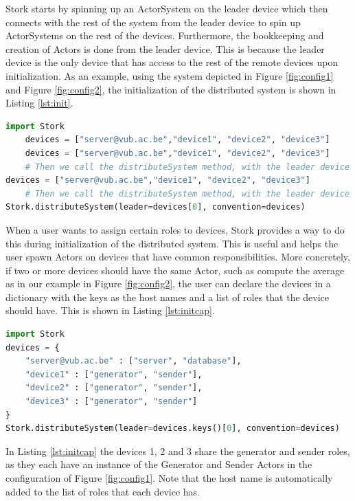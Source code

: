 \documentclass[a4paper]{article}
\begin{document}
Stork starts by spinning up an ActorSystem on the leader device which then connects with the rest of the system from the leader device to spin up ActorSystems on the rest of the devices. Furthermore, the bookkeeping and creation of Actors is done from the leader device. This is because the leader device is the only device that has access to the rest of the remote devices upon initialization. As an example, using the system depicted in Figure \ref{fig:config1} and Figure \ref{fig:config2}, the initialization of the distributed system is shown in Listing \ref{lst:init}.
\begin{lstlisting}[language=Python, caption=Initializing the distributed system, label=lst:init]
import Stork
    devices = ["server@vub.ac.be","device1", "device2", "device3"]
    devices = ["server@vub.ac.be","device1", "device2", "device3"]
    # Then we call the distributeSystem method, with the leader device being the first host name in the list of devices.
devices = ["server@vub.ac.be","device1", "device2", "device3"]
    # Then we call the distributeSystem method, with the leader device being the first host name in the list of devices.
Stork.distributeSystem(leader=devices[0], convention=devices)
\end{lstlisting}
When a user wants to assign certain roles to devices, Stork provides a way to do this during initialization of the distributed system. This is useful and helps the user spawn Actors on devices that have common responsibilities. More concretely, if two or more devices should have the same Actor, such as compute the average as in our example in Figure \ref{fig:config2}, the user can declare the devices in a dictionary with the keys as the host names and a list of roles that the device should have. This is shown in Listing \ref{lst:initcap}.
\vfill
\begin{lstlisting}[language=Python, caption=Initializing the distributed system with devices have common roles, label=lst:initcap]
import Stork
devices = {
    "server@vub.ac.be" : ["server", "database"],
    "device1" : ["generator", "sender"],
    "device2" : ["generator", "sender"],
    "device3" : ["generator", "sender"]
}
Stork.distributeSystem(leader=devices.keys()[0], convention=devices)
\end{lstlisting}
In Listing \ref{lst:initcap} the devices 1, 2 and 3 share the generator and sender roles, as they each have an instance of the Generator and Sender Actors in the configuration of Figure \ref{fig:config1}. Note that the host name is automatically added to the list of roles that each device has.
\end{document}

